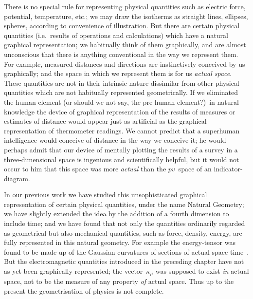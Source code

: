 \documentclass[12pt]{book}
\begin{document}
There is no special rule for representing physical quantities such as electric
force, potential, temperature, etc.; we may draw the isotherms as straight
lines, ellipses, spheres, according to convenience of illustration. But there are
certain physical quantities (i.e.\ results of operations and calculations) which
have a natural graphical representation; we habitually think of them graphically,
and are almost unconscious that there is anything conventional in the
way we represent them. For example, measured distances and directions are
instinctively conceived by us graphically; and the space in which we represent
them is for us \emph{actual space}. These quantities are not in their intrinsic
nature dissimilar from other physical quantities which are not habitually represented
geometrically. If we eliminated the human element (or should we not
say, the pre\hyp{}human element?)\ in natural knowledge the device of graphical
representation of the results of measures or estimates of distance would appear
just as artificial as the graphical representation of thermometer readings. We
cannot predict that a superhuman intelligence would conceive of distance in
the way we conceive it; he would perhaps admit that our device of mentally
plotting the results of a survey in a three\hyp{}dimensional space is ingenious and
scientifically helpful, but it would not occur to him that this space was more
\emph{actual} than the $pv$~space of an indicator\hyp{}diagram.

In our previous work we have studied this unsophisticated graphical representation
of certain physical quantities, under the name Natural Geometry;
we have slightly extended the idea by the addition of a fourth dimension to
include time; and we have found that not only the quantities ordinarily
regarded as geometrical but also mechanical quantities, such as force, density,
energy, are fully represented in this natural geometry. For example the energy\hyp{}tensor
was found to be made up of the Gaussian curvatures of sections of actual
space-time~. But the electromagnetic quantities introduced in the preceding
chapter have not as yet been graphically represented; the vector~$\kappa_{\mu}$ was
supposed to exist \emph{in} actual space, not to be the measure of any property \emph{of} actual
space. Thus up to the present the geometrisation of physics is not complete.
\end{document}
